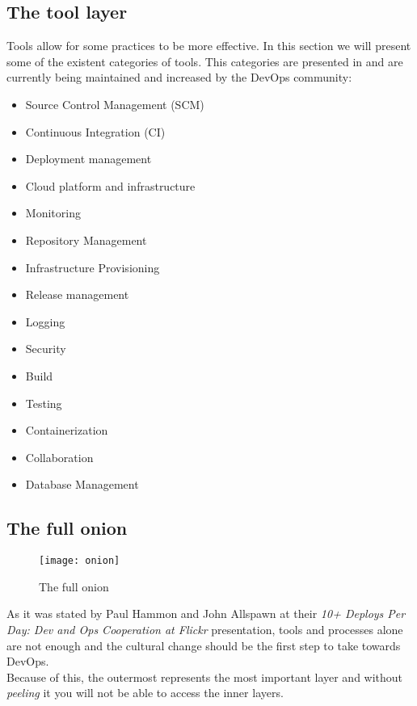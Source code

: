       \subsection{The tool layer} \label{chap:stateoftheart:sec:devops:sec:tools}
      Tools allow for some practices to be more effective. In this section we will present some of the existent categories of tools. This categories are presented in \cite{Labs} and are currently being maintained and increased by the DevOps community:
      \begin{multicols}{3}
        \begin{itemize}
            \item Source Control Management (SCM)
            \item Continuous Integration (CI)
            \item Deployment management
            \item Cloud platform and infrastructure
            \item Monitoring
        \end{itemize}
        \begin{itemize}
            \item Repository Management
            \item Infrastructure Provisioning
            \item Release management
            \item Logging
            \item Security
        \end{itemize}
        \begin{itemize}
            \item Build
            \item Testing
            \item Containerization
            \item Collaboration
            \item Database Management
        \end{itemize}
      \end{multicols}

      \subsection{The full onion} \label{chap:stateoftheart:sec:devops:sec:onion}
        \begin{wrapfigure}{R}{0.4\textwidth}
            \texttt{[image: onion]}
            \caption{The full onion \cite{DaveSayers2013}}
            \label{fig:onion}
        \end{wrapfigure}
        As it was stated by Paul Hammon and John Allspawn at their \textit{10+ Deploys Per Day: Dev and Ops Cooperation at Flickr} presentation, tools and processes alone are not enough and the cultural change should be the first step to take towards DevOps. \\
        Because of this, the outermost represents the most important layer and without \textit{peeling} it you will not be able to access the inner layers.

